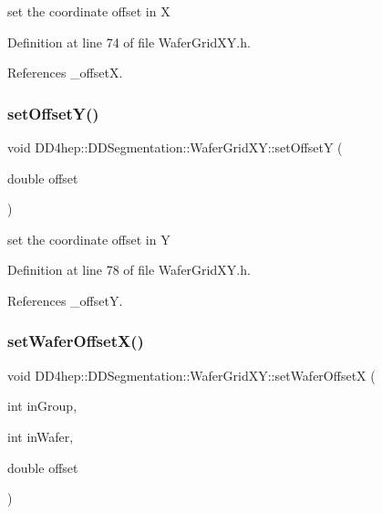 set the coordinate offset in X 



Definition at line 74 of file Wafer\+Grid\+X\+Y.\+h.



References \+\_\+offsetX.

\hypertarget{class_d_d4hep_1_1_d_d_segmentation_1_1_wafer_grid_x_y_a0db51fa22c800ca21f6c6c18b0740012}{}\label{class_d_d4hep_1_1_d_d_segmentation_1_1_wafer_grid_x_y_a0db51fa22c800ca21f6c6c18b0740012} 
\subsubsection{\texorpdfstring{set\+Offset\+Y()}{setOffsetY()}}
{\footnotesize\ttfamily void D\+D4hep\+::\+D\+D\+Segmentation\+::\+Wafer\+Grid\+X\+Y\+::set\+OffsetY (\begin{DoxyParamCaption}\item[{double}]{offset }\end{DoxyParamCaption})\hspace{0.3cm}{\ttfamily [inline]}}



set the coordinate offset in Y 



Definition at line 78 of file Wafer\+Grid\+X\+Y.\+h.



References \+\_\+offsetY.

\hypertarget{class_d_d4hep_1_1_d_d_segmentation_1_1_wafer_grid_x_y_a95441c0bdca2bd9d72f5711a98bbec83}{}\label{class_d_d4hep_1_1_d_d_segmentation_1_1_wafer_grid_x_y_a95441c0bdca2bd9d72f5711a98bbec83} 
\subsubsection{\texorpdfstring{set\+Wafer\+Offset\+X()}{setWaferOffsetX()}}
{\footnotesize\ttfamily void D\+D4hep\+::\+D\+D\+Segmentation\+::\+Wafer\+Grid\+X\+Y\+::set\+Wafer\+OffsetX (\begin{DoxyParamCaption}\item[{int}]{in\+Group,  }\item[{int}]{in\+Wafer,  }\item[{double}]{offset }\end{DoxyParamCaption})\hspace{0.3cm}{\ttfamily [inline]}}



